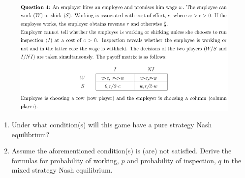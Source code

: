 \documentclass[12pt]{article}
\begin{document}
\begin{figure}[h!]
\includegraphics[width=\linewidth]{./assets/201805201650.png}
\end{figure}

\begin{enumerate}[label=\alph*)]
\item Under what condition(s) will this game have a pure strategy Nash equilibrium?
\item Assume the aforementioned condition(s) is (are) not satisfied.  Derive the formulas for
probability of working, $p$ and probability of inspection, $q$ in the mixed strategy Nash equilibrium.
\end{enumerate}
\end{document}
